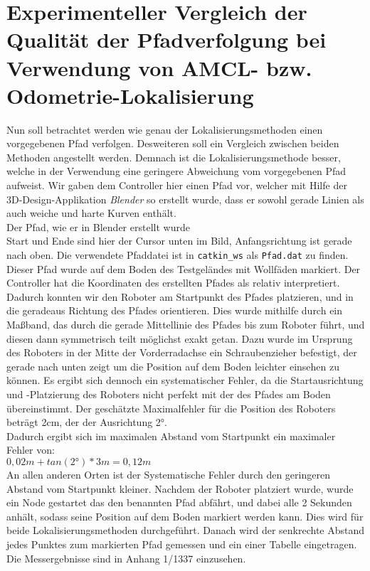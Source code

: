 \documentclass[11pt,a4paper]{article}
\begin{document}
\section{Experimenteller Vergleich der Qualität der Pfadverfolgung bei Verwendung von AMCL-  bzw. Odometrie-Lokalisierung}
Nun soll betrachtet werden wie genau der Lokalisierungsmethoden einen vorgegebenen Pfad verfolgen. Desweiteren soll ein Vergleich zwischen beiden Methoden angestellt werden. 
Demnach ist die Lokalisierungsmethode besser, welche in der Verwendung eine geringere Abweichung vom vorgegebenen Pfad aufweist. 
Wir gaben dem Controller hier einen Pfad vor, welcher mit Hilfe der 3D-Design-Applikation \textit{Blender} so erstellt wurde, dass er sowohl
gerade Linien als auch weiche und harte Kurven enthält. \vspace{10mm} \\ Der Pfad, wie er in Blender erstellt wurde \vspace{5mm} \\
Start und Ende sind hier der Cursor unten im Bild, Anfangsrichtung ist gerade nach oben. Die verwendete Pfaddatei ist in \verb+catkin_ws+ als 
\verb+Pfad.dat+ zu finden.
Dieser Pfad wurde auf dem Boden des Testgeländes mit Wollfäden markiert. Der Controller hat die Koordinaten des erstellten Pfades 
als relativ interpretiert. Dadurch konnten wir den Roboter am Startpunkt des Pfades platzieren, und in die geradeaus Richtung des Pfades orientieren. 
Dies wurde mithilfe durch ein Maßband, das durch die gerade Mittellinie des Pfades bis zum Roboter führt, und diesen dann symmetrisch teilt möglichst exakt getan. 
Dazu wurde im Ursprung des Roboters in der Mitte der Vorderradachse ein Schraubenzieher befestigt, der gerade nach unten zeigt um die Position auf dem 
Boden leichter einsehen zu können. Es ergibt sich dennoch ein systematischer Fehler, da die Startausrichtung und -Platzierung des Roboters nicht perfekt 
mit der des Pfades am Boden übereinstimmt. Der geschätzte Maximalfehler für die Position des Roboters beträgt 2cm, der der Ausrichtung 2°. 
\\Dadurch ergibt sich im maximalen Abstand vom Startpunkt ein maximaler Fehler von: \\
$
0,02m + tan(2°) * 3m = 0,12m
$                                                          \\ 
An allen anderen Orten ist der Systematische Fehler durch den geringeren Abstand vom Startpunkt kleiner.
Nachdem der Roboter platziert wurde, wurde ein Node gestartet das den benannten Pfad abfährt, und dabei alle 2 Sekunden anhält, sodass seine Position 
auf dem Boden markiert werden kann. Dies wird für beide Lokalisierungsmethoden durchgeführt. Danach wird der senkrechte Abstand jedes Punktes 
zum markierten Pfad gemessen und ein einer Tabelle eingetragen. Die Messergebnisse sind in Anhang 1/1337 einzusehen.
\end{document}
